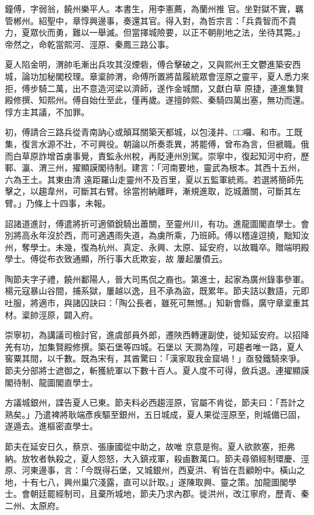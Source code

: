 \begin{pinyinscope}
 鐘傅，字弱翁，饒州樂平人。本書生，用李憲薦，為蘭州推
 官。坐對獄不實，羈管郴州。紹聖中，章惇興邊事，奏還其官。得入對，為哲宗言：「兵貴智而不貴力，夏眾伙而勇，難以一舉滅。但當擇城險要，以正不朝削地之法，坐待其斃。」帝然之，命乾當熙河、涇原、秦鳳三路公事。



 夏人陷金明，渭帥毛漸出兵攻其沒煙砦，傅合擊破之，又與熙州王文鬱進築安西城，論功加秘閣校理。章楶帥渭，命傅所置將苗履統眾會涇原之靈平，夏人悉力來拒，傅步騎二萬，出不意造河梁以濟師，遂作金城關，又獻白草
 原捷，連進集賢殿修撰、知熙州。傅自始仕至此，僅再歲。遂擅帥熙、秦騎四萬出塞，無功而還。惇方主其議，不加罪。



 初，傅請合三路兵從青南訥心或顛耳關築天都城，以包淺井、□□囉、和市。工既集，復言水源不壯，不可興役。朝論以所奏乖異，將罷傅，曾布為言，但褫職。俄而白草原詐增首虜事覺，責監永州稅，再貶連州別駕。崇寧中，復起知河中府，歷鄆、瀛、渭三州，擢顯謨閣待制。建言：「河南要地，靈武為根本。其西十五州，六為王土。其東由清
 遠距羅山走靈州不及百里，夏以五監軍統焉。若選將簡師先擊之，以趨韋州，可斷其右臂。徐當拊納離畔，漸規進取，訖城蕭關，可斷其左臂。」乃條上十四事，未報。



 詔諸道進討，傅遣將折可適領銳騎出蕭關，至靈州川，有功。進龍圖閣直學士。會別將高永年沒於西，而可適遇雨失道，為虜所乘，乃班師。傅以稽違逗撓，黜知汝州，奪學士。未幾，復為杭州、真定、永興、太原、延安府，以故職卒。贈端明殿學士。傅從布衣致通顯，所行事大氐欺妄，故
 屢起屢僨云。



 陶節夫字子禮，饒州鄱陽人，晉大司馬侃之裔也。第進士，起家為廣州錄事參軍。楊元寇暴山谷間，捕系獄，屢越以逸，且不承為盜，既累年。節夫詰以數語，元即吐服，將適市，與諸囚訣曰：「陶公長者，雖死可無憾。」知新會縣，廣守章楶重其材。楶帥涇原，闢入府。



 崇寧初，為講議司檢討官，進虞部員外郎，遷陜西轉運副使，徙知延安府。以招降羌有功，加集賢殿修撰。築石堡等四城。石堡以
 天澗為隍，可趨者唯一路，夏人窖粟其間，以千數。既為宋有，其酋驚曰：「漢家取我金窟堝！」亟發鐵騎來爭。節夫分部將士遮御之，斬獲統軍以下數十百人。夏人度不可得，斂兵退。連擢顯謨閣待制、龍圖閣直學士。



 方議城銀州，諜告夏人已東。節夫料必西趨涇原，官屬不肯從，節夫曰：「吾計之熟矣。」乃遣裨將耿端彥疾驅至銀州，五日城成，夏人果從涇原至，則城備已固，遂遁去。進樞密直學士。



 節夫在延安日久，蔡京、張康國從中助之，故唯
 京意是徇。夏人欲款塞，拒弗納。放牧者執殺之，夏人怨怒，大入鎮戎軍，殺鹵數萬口。節夫尋領經制環慶、涇原、河東邊事，言：「今既得石堡，又城銀州，西夏洪、宥皆在吾顧盼中。橫山之地，十有七八，興州巢穴淺露，直可以計取。」遂陳取興、靈之策。加龍圖閣學士。會朝廷罷經制司，且棄所城地，節夫乃求內郡。徙洪州，改江寧府，歷青、秦二州、太原府。




\end{pinyinscope}
